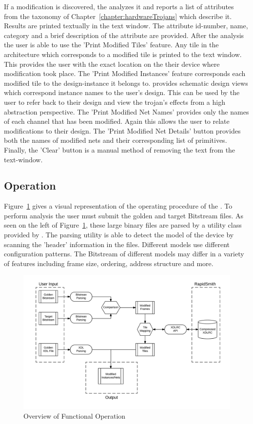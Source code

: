 If a modification is discovered, the \NameNoPeriod analyzes it and reports a list of attributes from the taxonomy of Chapter~\ref{chapter:hardwareTrojans} which describe it.
Results are printed textually in the text window.
The attribute id-number, name, category and a brief description of the attribute are provided.
After the analysis the user is able to use the 'Print Modified Tiles' feature.
Any tile in the architecture which corresponds to a modified tile is printed to the text window. 
This provides the user with the exact location on the their device where modification took place.
The 'Print Modified Instances' feature corresponds each modified tile to the design-instance it belongs to.
\Xilinx provides schematic design views which correspond instance names to the user's design.
This can be used by the user to refer back to their design and view the trojan's effects from a high abstraction perspective.
The 'Print Modified Net Names' provides only the names of each channel that has been modified. 
Again this allows the user to relate modifications to their design.
The 'Print Modified Net Details' button provides both the names of modified nets and their corresponding list of primitives.
Finally, the 'Clear' button is a manual method of removing the text from the text-window.
\subsection{Operation} \label{sec:operation}
Figure~\ref{fig:Operation} gives a visual representation of the operating procedure of the \Name.
To perform analysis the user must submit the \gls{golden} and \gls{target} \gls{Bitstream} files.
As seen on the left of Figure~\ref{fig:Operation}, these large binary files are parsed by a utility class provided by \RapidSmith. 
The parsing utility is able to detect the model of the device by scanning the 'header' information in the files.
Different \Xilinx models use different configuration patterns.
The \gls{Bitstream} of different models may differ in a variety of features including frame size, ordering, address structure and more.
\begin{figure}[h]
	\centering
	\includegraphics[width=1\linewidth]{Figures/Operation}
	\caption[Overview of Functional Operation]{Overview of Functional Operation}
	\label{fig:Operation}
\end{figure}


